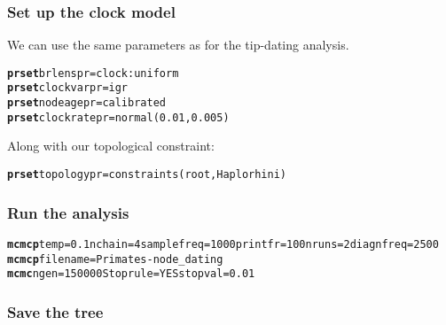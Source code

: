\documentclass{article}\usepackage[]{graphicx}\usepackage[]{color}
\makeatletter
\newcommand{\hlstr}[1]{\textcolor[rgb]{0.192,0.494,0.8}{#1}}%
\newcommand{\hlkwd}[1]{\textcolor[rgb]{0.737,0.353,0.396}{\textbf{#1}}}%
\newenvironment{kframe}{%
 \def\at@end@of@kframe{}%
 \ifinner\ifhmode%
  \def\at@end@of@kframe{\end{minipage}}%
  \begin{minipage}{\columnwidth}%
 \fi\fi%
 \def\FrameCommand##1{\hskip\@totalleftmargin \hskip-\fboxsep
 \colorbox{shadecolor}{##1}\hskip-\fboxsep
     \hskip-\linewidth \hskip-\@totalleftmargin \hskip\columnwidth}%
 \MakeFramed {\advance\hsize-\width
   \@totalleftmargin\z@ \linewidth\hsize
   \@setminipage}}%
 {\par\unskip\endMakeFramed%
 \at@end@of@kframe}
\newenvironment{knitrout}{}{} %
\makeatother
\begin{document}
\subsubsection{Set up the clock model}
We can use the same parameters as for the tip-dating analysis.
\begin{knitrout}
\color{fgcolor}\begin{kframe}
\begin{alltt}
\hlkwd{prset} brlenspr=\hlstr{clock:uniform}
\hlkwd{prset} clockvarpr=\hlstr{igr}
\hlkwd{prset} nodeagepr=\hlstr{calibrated}
\hlkwd{prset} clockratepr=\hlstr{normal(0.01,0.005)}
\end{alltt}
\end{kframe}
\end{knitrout}

\noindent Along with our topological constraint:
\begin{knitrout}
\color{fgcolor}\begin{kframe}
\begin{alltt}
\hlkwd{prset} topologypr=\hlstr{constraints(root, Haplorhini)}
\end{alltt}
\end{kframe}
\end{knitrout}


\subsubsection{Run the analysis}
\begin{knitrout}
\color{fgcolor}\begin{kframe}
\begin{alltt}
\hlkwd{mcmcp} temp=\hlstr{0.1} nchain=\hlstr{4} samplefreq=\hlstr{1000} printfr=\hlstr{100} nruns=\hlstr{2} diagnfreq=\hlstr{2500}
\hlkwd{mcmcp} filename=\hlstr{Primates-node_dating}
\hlkwd{mcmc} ngen=\hlstr{150000} Stoprule=\hlstr{YES} stopval=\hlstr{0.01}
\end{alltt}
\end{kframe}
\end{knitrout}

\subsubsection{Save the tree}
\end{document}
